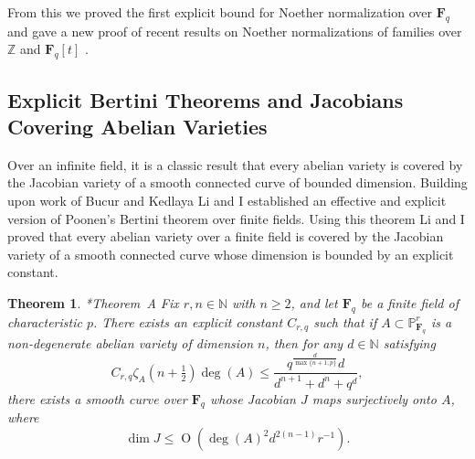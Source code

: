 \documentclass[11pt,reqno]{amsart}
\newtheorem{theorem}[lemma]{Theorem}
\newtheorem{cor}[lemma]{Corollary}
\theoremstyle{remark}
\newcommand{\Prob}{\operatorname{Prob}}
\newcommand{\fF}{\mathbf F}
\newcommand{\OO}{\operatorname{O}}
\newcommand{\N}{\mathbb{N}}
\renewcommand{\P}{\mathbb{P}}
\newcommand{\Z}{\mathbb{Z}}
\begin{document}


From this we proved the first explicit bound for Noether normalization over $\fF_{q}$ and gave a new proof of recent results on Noether normalizations of families over $\Z$ and $\fF_{q}[t]$ \cite{gabberLiuLorenzini15, cmbpt}.



\subsection{Explicit Bertini Theorems and Jacobians Covering Abelian Varieties}

Over an infinite field, it is a classic result that every abelian variety is covered by the Jacobian variety of a smooth connected curve of bounded dimension. Building upon work of Bucur and Kedlaya \cite{bucurKedlaya12} Li and I established an effective and explicit version of Poonen's Bertini theorem over finite fields. Using this theorem Li and I proved that every abelian variety over a finite field is covered by the Jacobian variety of a smooth connected curve whose dimension is bounded by an explicit constant. 

\begin{theorem}\cite{bruceLi19}*{Theorem~A}
Fix $r,n\in \N$ with $n\geq2$, and let $\fF_{q}$ be a finite field of characteristic $p$. There exists an explicit constant $C_{r,q}$ such that if $A\subset \P^{r}_{\fF_q}$ is a non-degenerate abelian variety of dimension $n$, then for any $d\in \N$ satisfying 
\[
C_{r,q}\zeta_{A}\left(n+\tfrac{1}{2}\right) \deg(A) \leq  \frac{q^{\frac{d}{\max\{n+1,p\}}}d}{d^{n+1}+d^n+q^{d}},
\]
there exists a smooth curve over $\fF_{q}$ whose Jacobian $J$ maps surjectively onto $A$, where 
\[
\dim J\leq 
\OO\left( \deg(A)^2 d^{2(n-1)}r^{-1}\right).
\]
\end{theorem} 
\end{document}
